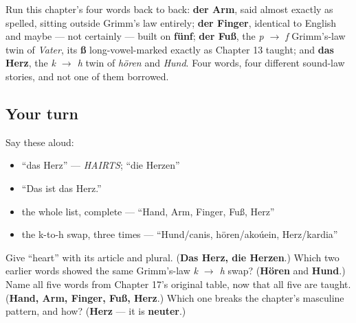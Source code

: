 \begin{grammarlens}[title={Grammar Lens: the whole chapter, run once more}]
Run this chapter's four words back to back: \textbf{der Arm}, said almost exactly as spelled, sitting outside Grimm's law entirely; \textbf{der Finger}, identical to English and maybe — not certainly — built on \textbf{fünf}; \textbf{der Fuß}, the \emph{p $\to$ f} Grimm's-law twin of \emph{Vater}, its \textbf{ß} long-vowel-marked exactly as Chapter 13 taught; and \textbf{das Herz}, the \emph{k $\to$ h} twin of \emph{hören} and \emph{Hund}. Four words, four different sound-law stories, and not one of them borrowed.
\end{grammarlens}

\subsection*{Your turn}
Say these aloud:

\begin{itemize}
\raggedright
  \item \textquotedblleft{}das Herz\textquotedblright{} — \emph{HAIRTS}; \textquotedblleft{}die Herzen\textquotedblright{}
  \item \textquotedblleft{}Das ist das Herz.\textquotedblright{}
  \item the whole list, complete — \textquotedblleft{}Hand, Arm, Finger, Fuß, Herz\textquotedblright{}
  \item the k-to-h swap, three times — \textquotedblleft{}Hund/canis, hören/akoúein, Herz/kardia\textquotedblright{}
\end{itemize}

\begin{tcolorbox}[breakable,colback=teal!4,colframe=teal!35!black,title={Before you move on}]
Give \textquotedblleft{}heart\textquotedblright{} with its article and plural. (\textbf{Das Herz, die Herzen}.) Which two earlier words showed the same Grimm's-law \emph{k $\to$ h} swap? (\textbf{Hören} and \textbf{Hund}.) Name all five words from Chapter 17's original table, now that all five are taught. (\textbf{Hand, Arm, Finger, Fuß, Herz}.) Which one breaks the chapter's masculine pattern, and how? (\textbf{Herz} — it is \textbf{neuter}.)
\end{tcolorbox}
